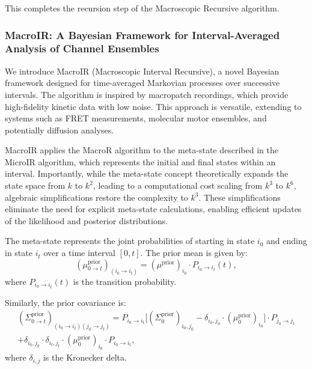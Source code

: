 \documentclass[pdflatex,sn-mathphys-num]{sn-jnl}%
\theoremstyle{thmstyleone}%
\theoremstyle{thmstyletwo}%
\theoremstyle{thmstylethree}%
\begin{document}
This completes the recursion step of the Macroscopic Recursive algorithm.


\subsubsection{MacroIR: A Bayesian Framework for Interval-Averaged Analysis of Channel Ensembles}

We introduce MacroIR (Macroscopic Interval Recursive), a novel Bayesian framework designed for time-averaged Markovian processes over successive intervals. The algorithm is inspired by macropatch recordings, which provide high-fidelity kinetic data with low noise. This approach is versatile, extending to systems such as FRET measurements, molecular motor ensembles, and potentially diffusion analyses.

MacroIR applies the MacroR algorithm to the meta-state described in the MicroIR algorithm, which represents the initial and final states within an interval. Importantly, while the meta-state concept theoretically expands the state space from \( k \) to \( k^2 \), leading to a computational cost scaling from \( k^3 \) to \( k^6 \), algebraic simplifications restore the complexity to \( k^3 \). These simplifications eliminate the need for explicit meta-state calculations, enabling efficient updates of the likelihood and posterior distributions.

The meta-state represents the joint probabilities of starting in state \( i_0 \) and ending in state \( i_t \) over a time interval \( [0, t] \). The prior mean is given by:
\begin{equation}
	(\mu^{\text{prior}}_{0 \rightarrow t})_{(i_0 \rightarrow i_t)} = (\mu^{\text{prior}})_{i_0} \cdot P_{i_0 \rightarrow i_t}(t),
	\label{eq:meta_mean_prior}
\end{equation}
where \( P_{i_0 \rightarrow i_t}(t) \) is the transition probability.

Similarly, the prior covariance is:
\begin{multline}
	(\Sigma^{\text{prior}}_{0 \rightarrow t})_{(i_0 \rightarrow i_t)(j_0 \rightarrow j_t)} = 
	P_{i_0 \rightarrow i_t} \big[(\Sigma^{\text{prior}}_0)_{i_0, j_0} - \delta_{i_0, j_0} \cdot (\mu^{\text{prior}}_0)_{i_0} \big] \cdot P_{j_0 \rightarrow j_t} \\
	+ \delta_{i_0, j_0} \cdot \delta_{i_t, j_t} \cdot (\mu^{\text{prior}}_0)_{i_0} \cdot P_{i_0 \rightarrow i_t},
	\label{eq:meta_covariance_prior}
\end{multline}
where \( \delta_{i, j} \) is the Kronecker delta.
\end{document}
